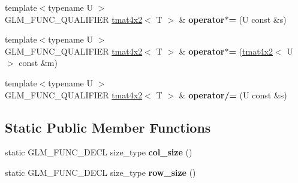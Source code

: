 \begin{DoxyCompactItemize}
\item 
\hypertarget{structglm_1_1detail_1_1tmat4x2_ad73fae6782aa2a8b7513c7b04188dfbb}{{\footnotesize template$<$typename U $>$ }\\G\-L\-M\-\_\-\-F\-U\-N\-C\-\_\-\-Q\-U\-A\-L\-I\-F\-I\-E\-R \hyperlink{structglm_1_1detail_1_1tmat4x2}{tmat4x2}$<$ T $>$ \& {\bfseries operator$\ast$=} (U const \&s)}\label{structglm_1_1detail_1_1tmat4x2_ad73fae6782aa2a8b7513c7b04188dfbb}

\item 
\hypertarget{structglm_1_1detail_1_1tmat4x2_a433c0ce4ddf3f2721a7f5e064e179277}{{\footnotesize template$<$typename U $>$ }\\G\-L\-M\-\_\-\-F\-U\-N\-C\-\_\-\-Q\-U\-A\-L\-I\-F\-I\-E\-R \hyperlink{structglm_1_1detail_1_1tmat4x2}{tmat4x2}$<$ T $>$ \& {\bfseries operator$\ast$=} (\hyperlink{structglm_1_1detail_1_1tmat4x2}{tmat4x2}$<$ U $>$ const \&m)}\label{structglm_1_1detail_1_1tmat4x2_a433c0ce4ddf3f2721a7f5e064e179277}

\item 
\hypertarget{structglm_1_1detail_1_1tmat4x2_a15c7b65fbecf0e4d7cdf8699131c61db}{{\footnotesize template$<$typename U $>$ }\\G\-L\-M\-\_\-\-F\-U\-N\-C\-\_\-\-Q\-U\-A\-L\-I\-F\-I\-E\-R \hyperlink{structglm_1_1detail_1_1tmat4x2}{tmat4x2}$<$ T $>$ \& {\bfseries operator/=} (U const \&s)}\label{structglm_1_1detail_1_1tmat4x2_a15c7b65fbecf0e4d7cdf8699131c61db}

\end{DoxyCompactItemize}
\subsection*{Static Public Member Functions}
\begin{DoxyCompactItemize}
\item 
\hypertarget{structglm_1_1detail_1_1tmat4x2_a94ced6676f6709e4b71412eb27d19802}{static G\-L\-M\-\_\-\-F\-U\-N\-C\-\_\-\-D\-E\-C\-L size\-\_\-type {\bfseries col\-\_\-size} ()}\label{structglm_1_1detail_1_1tmat4x2_a94ced6676f6709e4b71412eb27d19802}

\item 
\hypertarget{structglm_1_1detail_1_1tmat4x2_aa505db7165ff6eae50386db0f4b8e435}{static G\-L\-M\-\_\-\-F\-U\-N\-C\-\_\-\-D\-E\-C\-L size\-\_\-type {\bfseries row\-\_\-size} ()}\label{structglm_1_1detail_1_1tmat4x2_aa505db7165ff6eae50386db0f4b8e435}

\end{DoxyCompactItemize}


